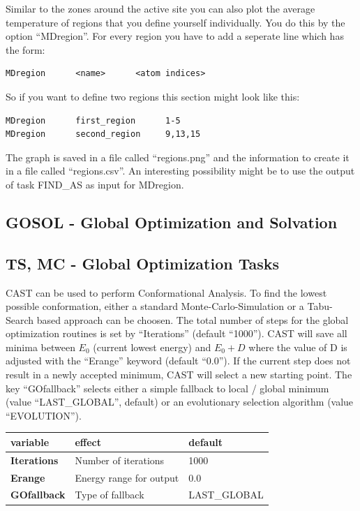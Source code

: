 \documentclass[10pt,a4paper]{article} %
\begin{document}
Similar to the zones around the active site you can also plot the average temperature of regions that you define yourself individually. You do this by the option ``MDregion''. For every region you have to add a seperate line which has the form:
\begin{lstlisting}
MDregion      <name>      <atom indices>
\end{lstlisting}
So if you want to define two regions this section might look like this:
\begin{lstlisting}
MDregion      first_region      1-5
MDregion      second_region     9,13,15
\end{lstlisting}
The graph is saved in a file called ``regions.png'' and the information to create it in a file called ``regions.csv''. An interesting possibility might be to use the output of task FIND\_AS as input for MDregion.
	
\subsection{GOSOL - Global Optimization and Solvation}	

	
	\subsection{TS, MC - Global Optimization Tasks}
	\ac{CAST} can be used to perform Conformational Analysis. To find the lowest possible conformation, either a standard Monte-Carlo-Simulation\supercite{mc_original, mmc_original} or a Tabu-Search\cite{tabusearch_original1, tabusearch_original2, tabusearch_original3} based approach can be choosen. The total number of steps for the global optimization routines is set by ``Iterations'' (default ``1000''). \ac{CAST} will save all minima between $E_0$ (current lowest energy) and $E_0 + D$ where the value of D is adjusted with the ``Erange'' keyword (default ``0.0'').
	If the current step does not result in a newly accepted minimum, \ac{CAST} will select a new starting point. The key ``GOfallback'' selects either a simple fallback to local / global minimum (value ``LAST\_GLOBAL'', default) or an evolutionary selection algorithm (value ``EVOLUTION'').
	
	\begin{longtable}{l|l|l}
	variable & effect & default \\
	\hline
	\textbf{Iterations} & Number of iterations & 1000 \\
	\textbf{Erange} & Energy range for output & 0.0 \\
		\textbf{GOfallback} & Type of fallback & LAST\_GLOBAL \\
	\end{longtable}
	
\end{document}
